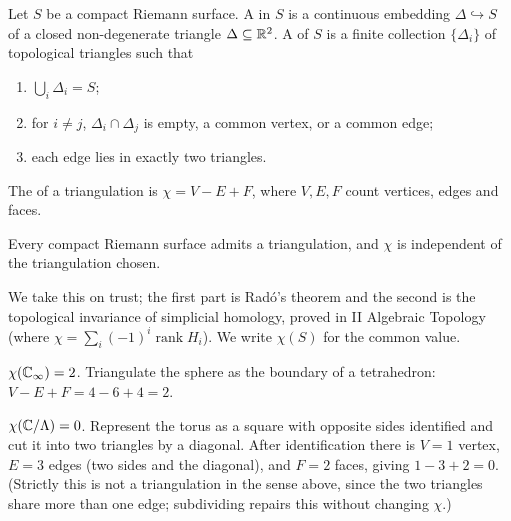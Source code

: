 \documentclass[a4paper]{scrartcl}
\newcommand{\Cinf}{\C_\infty}
\begin{document}
\begin{definition}[Triangulation]
	Let $S$ be a compact Riemann surface. A  in $S$ is a
	continuous embedding $\Delta \hookrightarrow S$ of a closed non-degenerate triangle
	$\Delta \subseteq \mathbb{R}^2$. A  of $S$ is a finite collection
	$\{\Delta_i\}$ of topological triangles such that
	\begin{enumerate}[label=(\roman*)]
		\item $\bigcup_i \Delta_i = S$;
		\item for $i \neq j$, $\Delta_i \cap \Delta_j$ is empty, a common vertex, or a
		common edge;
		\item each edge lies in exactly two triangles.
	\end{enumerate}
\end{definition}

\begin{definition}
	The  of a triangulation is $\chi = V - E + F$, where $V, E,
	F$ count vertices, edges and faces.
\end{definition}

\begin{lemma}\label{lem:triangexists}
	Every compact Riemann surface admits a triangulation, and $\chi$ is independent of the
	triangulation chosen.
\end{lemma}

We take this on trust; the first part is Rad\'o's theorem and the second is the
topological invariance of simplicial homology, proved in II Algebraic Topology (where
$\chi = \sum_i (-1)^i \operatorname{rank} H_i$). We write $\chi(S)$ for the common value.

\begin{example}
	$\chi(\Cinf) = 2$. Triangulate the sphere as the boundary of a tetrahedron:
	$V - E + F = 4 - 6 + 4 = 2$.
\end{example}

\begin{example}
	$\chi(\mathbb{C}/\Lambda) = 0$. Represent the torus as a square with opposite sides identified
	and cut it into two triangles by a diagonal. After identification there is $V=1$ vertex,
	$E = 3$ edges (two sides and the diagonal), and $F = 2$ faces, giving
	$1 - 3 + 2 = 0$. (Strictly this is not a triangulation in the sense above, since the two
	triangles share more than one edge; subdividing repairs this without changing $\chi$.)
\end{example}
\end{document}
